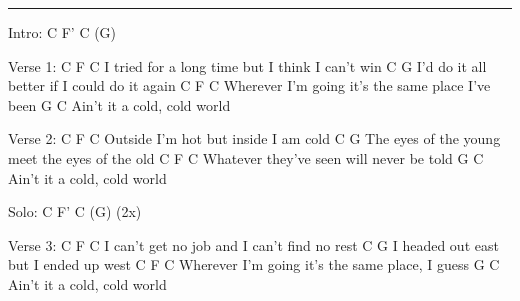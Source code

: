 \noindent\rule{\columnwidth}{1pt}

\begin{lstsong}
Intro:
C  F'  C  (G)

Verse 1:
C                             F             C
I tried for a long time but I think I can't win
C                                       G
I'd do it all better if I could do it again
    C                       F               C
Wherever I'm going it's the same place I've been
            G          C
Ain't it a cold, cold world

Verse 2:
C                      F         C
Outside I'm hot but inside I am cold
C                                          G
The eyes of the young meet the eyes of the old
    C                       F        C
Whatever they've seen will never be told
            G          C
Ain't it a cold, cold world

Solo: C  F'  C  (G) (2x)

Verse 3:
	C                      F             C
I can't get no job and I can't find no rest
  C                              G
I headed out east but I ended up west 
    C                            F        C
Wherever I'm going it's the same place, I guess
            G          C
Ain't it a cold, cold world
\end{lstsong}
\newpage

\begin{comment}
Verse 3:
                                    F            C
Then an old lady asked me bout this new daylight time
                                            G
I said it don't matter and she said I don't mind
         C                         F        C
Then the bus driver said you still owe me a dime
            G          C
Ain't it a cold, cold world

Verse 5:
                               F          C
I might have to leave you, I think's what she said
                                        G
Wish I could sleep 'stead of tossing in bed
      C                           F          C
And I find myself thinking I'd be better off dead
            G          C
Ain't it a cold, cold world
            G          C
Ain't it a cold, cold world
\end{comment}


